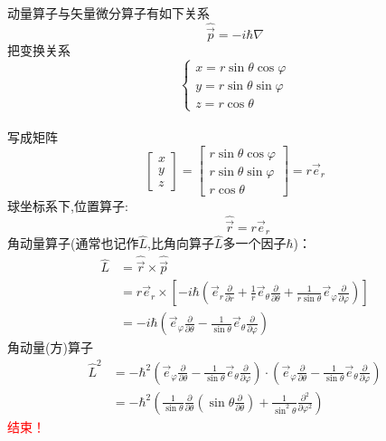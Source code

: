 	动量算子与矢量微分算子有如下关系
	\begin{equation}
		\hat{\vec{p}} =-i\hbar \nabla
	\end{equation}
	把变换关系
	$$\begin{cases}
		x= r\sin \theta \cos \varphi \\
		y= r\sin \theta \sin \varphi \\
		z=r\cos \theta
	\end{cases} $$
	~~\\
	写成矩阵
	$$
	\left[\begin{array}{ccc}
		x \\
		y \\
		z
	\end{array}\right]
	=
	\left[\begin{array}{ccc}
		r\sin \theta \cos \varphi  \\
		r\sin \theta \sin \varphi  \\
		r\cos \theta
	\end{array}\right]	
	=
	r \vec{e}_r$$ 
	球坐标系下,位置算子:
	\begin{equation}
		\qquad \hat{\vec{r}}=r \vec{e}_r 
	\end{equation}
	角动量算子(通常也记作$\hat{L}$,比角向算子$\hat{L}$多一个因子$\hbar$)：
	\begin{equation*}
		\begin{aligned}
		\hat{L} &= \hat{\vec{r}}\times \hat{\vec{p}} \\
		&= r \vec{e}_r \times \left[-i\hbar  ( \vec{e}_{r} \frac{\partial}{\partial r}+\frac{1}{r} \vec{e}_{\theta} \frac{\partial}{\partial \theta}+\frac{1}{r \sin \theta} \vec{e}_{\varphi} \frac{\partial}{\partial \varphi})\right]	\\ 
		&= -i \hbar   ( \vec{e}_{\varphi} \frac{\partial}{\partial \theta} - \frac{1}{\sin \theta}  \vec{e}_{\theta} \frac{\partial}{\partial \varphi} )
		\end{aligned}
	\end{equation*}
	角动量(方)算子
	\begin{equation*}
		\begin{split}
		\hat{L}	^2 &=   - \hbar ^2  ( \vec{e}_{\varphi} \frac{\partial}{\partial \theta} - \frac{1}{\sin \theta}  \vec{e}_{\theta} \frac{\partial}{\partial \varphi} )  \cdot   ( \vec{e}_{\varphi} \frac{\partial}{\partial \theta} - \frac{1}{\sin \theta}  \vec{e}_{\theta} \frac{\partial}{\partial \varphi} ) \\
		&= - \hbar ^2 (\frac{1}{\sin \theta  } \frac{\partial }{\partial \theta } (\sin \theta \frac{\partial }{\partial \theta } )
		+\frac{1}{\sin^2 \theta  } \frac{\partial^2}{\partial\varphi ^2} ) 	
		\end{split}
	\end{equation*}
	\textcolor{red}{结束！} 


